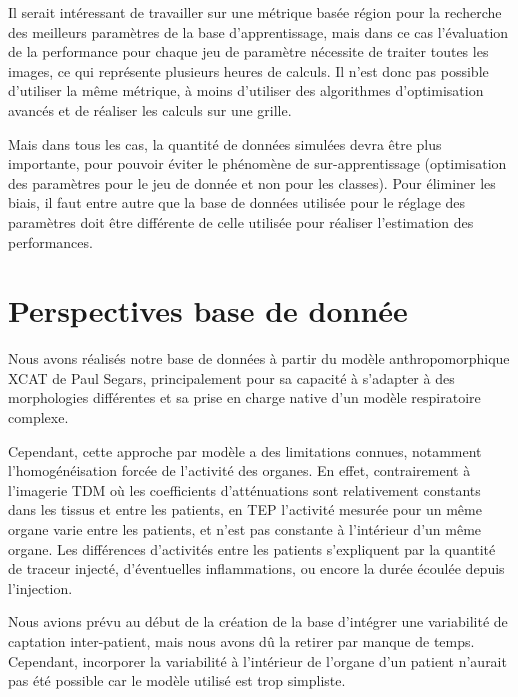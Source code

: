 Il serait intéressant de travailler sur une métrique basée région pour la recherche des meilleurs paramètres de la base d'apprentissage, mais dans ce cas l'évaluation de la performance pour chaque jeu de paramètre nécessite de traiter toutes les images, ce qui représente plusieurs heures de calculs. Il n'est donc pas possible d'utiliser la même métrique, à moins d'utiliser des algorithmes d'optimisation avancés et de réaliser les calculs sur une grille.

Mais dans tous les cas, la quantité de données simulées devra être plus importante, pour pouvoir éviter le phénomène de sur-apprentissage (optimisation des paramètres pour le jeu de donnée et non pour les classes). Pour éliminer les biais, il faut entre autre que la base de données utilisée pour le réglage des paramètres doit être différente de celle utilisée pour réaliser l'estimation des performances.


\section{Perspectives base de donnée}

Nous avons réalisés notre base de données à partir du modèle anthropomorphique XCAT de Paul Segars, principalement pour sa capacité à s'adapter à des morphologies différentes et sa prise en charge native d'un modèle respiratoire complexe.

Cependant, cette approche par modèle a des limitations connues, notamment l'homogénéisation forcée de l'activité des organes. En effet, contrairement à l'imagerie TDM où les coefficients d'atténuations sont relativement constants dans les tissus et entre les patients, en TEP l'activité mesurée pour un même organe varie entre les patients, et n'est pas constante à l'intérieur d'un même organe. Les différences d'activités entre les patients s'expliquent par la quantité de traceur injecté, d'éventuelles inflammations, ou encore la durée écoulée depuis l'injection. 

Nous avions prévu au début de la création de la base d'intégrer une variabilité de captation inter-patient, mais nous avons dû la retirer par manque de temps. Cependant, incorporer la variabilité à l'intérieur de l'organe d'un patient n'aurait pas été possible car le modèle utilisé est trop simpliste. 

